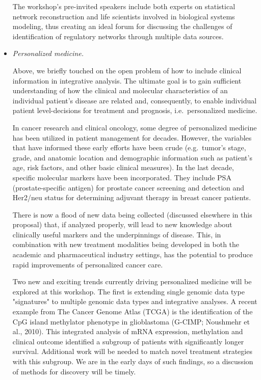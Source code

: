 \documentclass[12pt]{amsart}
\begin{document}
\begin{itemize}
  The workshop's pre-invited speakers include both experts on
  statistical network reconstruction and life scientists involved in
  biological systems modeling, thus creating an ideal forum for
  discussing the challenges of identification of regulatory networks
  through multiple data sources.

\item \textit{Personalized medicine.}

  Above, we briefly touched on the open problem of how to include
  clinical information in integrative analysis.  The ultimate goal is
  to gain sufficient understanding of how the clinical and molecular
  characteristics of an individual patient's disease are related and,
  consequently, to enable individual patient level-decisions for
  treatment and prognosis, i.e.\ personalized medicine.

  In cancer research and clinical oncology, some degree of
  personalized medicine has been utilized in patient management for
  decades.  However, the variables that have informed these early
  efforts have been crude (e.g.\ tumor's stage, grade, and anatomic
  location and demographic information such as patient's age, risk
  factors, and other basic clinical measures).  In the last decade,
  specific molecular markers have been incorporated. They include PSA
  (prostate-specific antigen) for prostate cancer screening and
  detection and Her2/neu status for determining adjuvant therapy in
  breast cancer patients.

  There is now a flood of new data being collected (discussed
  elsewhere in this proposal) that, if analyzed properly, will lead to
  new knowledge about clinically useful markers and the underpinnings
  of disease. This, in combination with new treatment modalities being
  developed in both the academic and pharmaceutical industry settings,
  has the potential to produce rapid improvements of personalized
  cancer care.

  Two new and exciting trends currently driving personalized medicine
  will be explored at this workshop. The first is extending single
  genomic data type "signatures" to multiple genomic data types and
  integrative analyses. A recent example from The Cancer Genome Atlas
  (TCGA) is the identification of the CpG island methylator phenotype
  in glioblastoma (G-CIMP; Noushmehr et al., 2010). This integrated
  analysis of mRNA expression, methylation and clinical outcome
  identified a subgroup of patients with significantly longer
  survival.  Additional work will be needed to match novel treatment
  strategies with this subgroup.  We are in the early days of such
  findings, so a discussion of methods for discovery will be timely.


\end{itemize}
\end{document}
